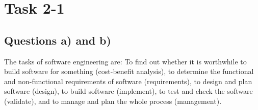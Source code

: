 \chapter{Task 2-1}
\section{Questions a) and b)}
 The tasks of software engineering are: To find out whether it is worthwhile to build software for something (cost-benefit analysis), to determine the functional and non-functional requirements of software (requirements), to design and plan software (design), to build software (implement), to test and check the software (validate), and to manage and plan the whole process (management).
 
 